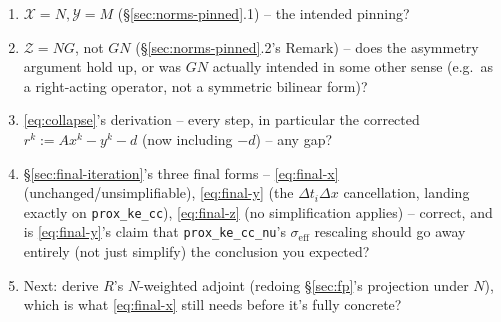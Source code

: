 \documentclass[11pt]{article}
\newcommand{\dt}{\Delta t}
\newcommand{\dx}{\Delta x}
\newcommand{\code}[1]{\texttt{#1}}
\begin{document}
\begin{enumerate}
  \item $\mathcal X=N,\mathcal Y=M$ (\S\ref{sec:norms-pinned}.1) -- the intended pinning?
  \item $\mathcal Z=NG$, not $GN$ (\S\ref{sec:norms-pinned}.2's Remark) -- does the
        asymmetry argument hold up, or was $GN$ actually intended in some other sense
        (e.g.\ as a right-acting operator, not a symmetric bilinear form)?
  \item \eqref{eq:collapse}'s derivation -- every step, in particular the corrected
        $r^k:=Ax^k-y^k-d$ (now including $-d$) -- any gap?
  \item \S\ref{sec:final-iteration}'s three final forms -- \eqref{eq:final-x}
        (unchanged/unsimplifiable), \eqref{eq:final-y} (the $\dt_i\dx$ cancellation,
        landing exactly on \code{prox\_ke\_cc}), \eqref{eq:final-z} (no simplification
        applies) -- correct, and is \eqref{eq:final-y}'s claim that
        \code{prox\_ke\_cc\_nu}'s $\sigma_{\mathrm{eff}}$ rescaling should go away
        entirely (not just simplify) the conclusion you expected?
  \item Next: derive $R$'s $N$-weighted adjoint (redoing \S\ref{sec:fp}'s projection under
        $N$), which is what \eqref{eq:final-x} still needs before it's fully concrete?
\end{enumerate}
\end{document}
